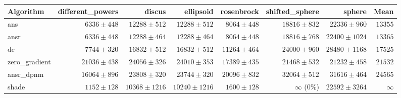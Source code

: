 \begin{tabular}{lrrrrrrr}
\toprule
Algorithm & different\_powers & discus & ellipsoid & rosenbrock & shifted\_sphere & sphere & Mean \\
\midrule
ans & $6336 \pm 448$ & $12288 \pm 512$ & $12288 \pm 512$ & $8064 \pm 448$ & $18816 \pm 832$ & $22336 \pm 960$ & $13355$ \\
ansr & $6336 \pm 448$ & $12288 \pm 464$ & $12288 \pm 464$ & $8064 \pm 448$ & $18816 \pm 768$ & $22400 \pm 1024$ & $13365$ \\
de & $7744 \pm 320$ & $16832 \pm 512$ & $16832 \pm 512$ & $11264 \pm 464$ & $24000 \pm 960$ & $28480 \pm 1168$ & $17525$ \\
zero\_gradient & $21036 \pm 438$ & $24056 \pm 326$ & $24010 \pm 353$ & $17389 \pm 435$ & $21468 \pm 532$ & $21232 \pm 458$ & $21532$ \\
ansr\_dpnm & $16064 \pm 896$ & $23808 \pm 320$ & $23744 \pm 320$ & $20096 \pm 832$ & $32064 \pm 512$ & $31616 \pm 464$ & $24565$ \\
shade & $1152 \pm 128$ & $10368 \pm 1216$ & $10240 \pm 1216$ & $1600 \pm 128$ & $\infty$ (0\%) & $22592 \pm 3264$ & $\infty$ \\
\bottomrule
\end{tabular}
